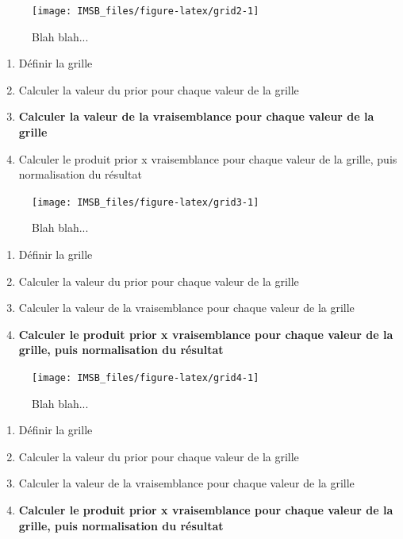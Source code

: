 \documentclass[
  a4paper,11pt,twoside,onecolumn,openright,final,oldfontcommands]{memoir}
\providecommand{\tightlist}{%
  \setlength{\itemsep}{0pt}\setlength{\parskip}{0pt}}
\theoremstyle{definition}
\theoremstyle{definition}
\theoremstyle{definition}
\theoremstyle{definition}
\theoremstyle{remark}
\begin{document}
\begin{figure}[!htb]

{\centering \texttt{[image: IMSB\_files/figure-latex/grid2-1]} 

}

\caption{Blah blah...}\label{fig:grid2}
\end{figure}

\begin{enumerate}
\def\labelenumi{\arabic{enumi}.}
\tightlist
\item
  Définir la grille
\item
  Calculer la valeur du prior pour chaque valeur de la grille
\item
  \textbf{Calculer la valeur de la vraisemblance pour chaque valeur de la grille}
\item
  Calculer le produit prior x vraisemblance pour chaque valeur de la grille, puis normalisation du résultat
\end{enumerate}

\begin{figure}[!htb]

{\centering \texttt{[image: IMSB\_files/figure-latex/grid3-1]} 

}

\caption{Blah blah...}\label{fig:grid3}
\end{figure}

\begin{enumerate}
\def\labelenumi{\arabic{enumi}.}
\tightlist
\item
  Définir la grille
\item
  Calculer la valeur du prior pour chaque valeur de la grille
\item
  Calculer la valeur de la vraisemblance pour chaque valeur de la grille
\item
  \textbf{Calculer le produit prior x vraisemblance pour chaque valeur de la grille, puis normalisation du résultat}
\end{enumerate}

\begin{figure}[!htb]

{\centering \texttt{[image: IMSB\_files/figure-latex/grid4-1]} 

}

\caption{Blah blah...}\label{fig:grid4}
\end{figure}

\begin{enumerate}
\def\labelenumi{\arabic{enumi}.}
\tightlist
\item
  Définir la grille
\item
  Calculer la valeur du prior pour chaque valeur de la grille
\item
  Calculer la valeur de la vraisemblance pour chaque valeur de la grille
\item
  \textbf{Calculer le produit prior x vraisemblance pour chaque valeur de la grille, puis normalisation du résultat}
\end{enumerate}
\end{document}
